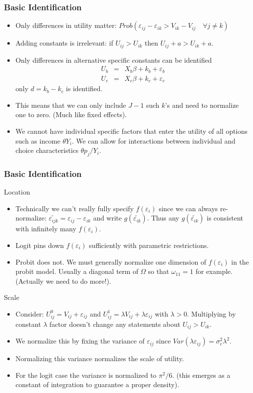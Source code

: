 \documentclass[xcolor=pdftex,dvipsnames,table,mathserif]{beamer}
\begin{document}
\begin{frame}
\frametitle{Basic Identification}
\small
\begin{itemize}
\item Only differences in utility matter: $Prob( \varepsilon_{ij}-\varepsilon_{ik} > V_{ik} - V_{ij} \quad \forall j \neq k)$
\item Adding constants is irrelevant: if $U_{ij} > U_{ik}$ then $U_{ij} + a > U_{ik} + a$.
\item Only differences in alternative specific constants can be identified
\begin{eqnarray*}
U_b &=& X_b \beta + k_b  + \varepsilon_b\\
U_c &=& X_c \beta + k_c  + \varepsilon_c
\end{eqnarray*}
only $d = k_b - k_c$ is identified.
\item This means that we can only include $J-1$ such $k$'s and need to normalize one to zero. (Much like fixed effects).
\item We cannot have individual specific factors that enter the utility of all options such as income $\theta Y_i$. We can allow for interactions between individual and choice characteristics $\theta p_{j}/ Y_i$.
\end{itemize}
\end{frame}

\begin{frame}
\frametitle{Basic Identification}
Location
\begin{itemize}
\item Technically we can't really fully specify $f(\varepsilon_i)$ since we can always re-normalize: $\widetilde{\varepsilon_{ijk}} = \varepsilon_{ij} - \varepsilon_{ik}$ and write $g(\widetilde{\varepsilon_{ik}})$. Thus any $g(\widetilde{\varepsilon_{ik}})$ is consistent with infinitely many $f(\varepsilon_i)$.
\item Logit pins down $f(\varepsilon_i)$ sufficiently with parametric restrictions.
\item Probit does not. We must generally normalize one dimension of $f(\varepsilon_i)$ in the probit model. Usually a diagonal term of $\Omega$ so that $\omega_{11} =1$ for example. (Actually we need to do more!).
\end{itemize}
Scale
\begin{itemize}
\item Consider: $U_{ij}^0 = V_{ij} + \varepsilon_{ij}$ and  $U_{ij}^1 = \lambda V_{ij} + \lambda \varepsilon_{ij}$ with $\lambda > 0$. Multiplying by constant $\lambda$ factor doesn't change any statements about $U_{ij} > U_{ik}$.
\item We normalize this by fixing the variance of $\varepsilon_{ij}$ since $Var(\lambda \varepsilon_{ij} ) = \sigma_e^2 \lambda^2$.
\item Normalizing this variance normalizes the scale of utility.
\item For the logit case the variance is normalized to $\pi^2/6$. (this emerges as a constant of integration to guarantee a proper density).
\end{itemize}
\end{frame}
\end{document}
